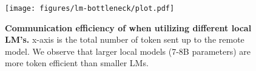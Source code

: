 

\begin{figure}[h!]
    \centering
    \texttt{[image: figures/lm-bottleneck/plot.pdf]}
    \caption{\textbf{Communication efficiency of \system when utilizing different local LM's.} x-axis is the total number of token sent up to the remote model. We observe that larger local models (7-8B parameters) are more token efficient than smaller LMs.
    }
    \label{fig:lm-bottleneck}
  \end{figure}


